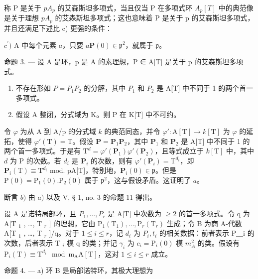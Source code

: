 称 P 是关于 \(pA_{p}\) 的艾森斯坦多项式，当且仅当 P 在多项式环 \(A_{p}[T]\) 中的典范像是关于理想 \(pA_{p}\) 的艾森斯坦多项式；这也意味着 P 是关于 p 的艾森斯坦多项式，并且还满足下述比 c) 更强的条件：

\(c^{\prime})\) A 中每个元素 \(a\)，只要 \(a\mathbf{P}(0)\in\mathfrak{p}^{2}\)，就属于 \(\mathfrak{p}\)。

命题 3. --- 设 A 是环，p 是 A 的素理想，P ∈ A{[}T{]} 是关于 p 的艾森斯坦多项式。

\begin{enumerate}
\def\labelenumi{\alph{enumi})}
\item
  不存在形如 \(P = P_{1}P_{2}\) 的分解，其中 \(P_{1}\) 和 \(P_{2}\) 是 A{[}T{]} 中不同于 1 的两个首一多项式。
\item
  假设 A 整闭，分式域为 K。则 P 在 K[T] 中不可约。
\end{enumerate}

令 \(\varphi\) 为从 A 到 A/p 的分式域 \(k\) 的典范同态，并令 \(\varphi':\mathrm{A}[\mathrm{T}]\to k[\mathrm{T}]\) 为 \(\varphi\) 的延拓，使得 \(\varphi'(\mathrm{T})=\mathrm{T}\)。假设 \(\mathbf{P}=\mathbf{P}_{1}\mathbf{P}_{2}\)，其中 \(\mathbf{P}_{1}\) 和 \(\mathbf{P}_{2}\) 是 A{[}T{]} 中不同于 1 的两个首一多项式。于是有 \(\mathrm{T}^{d}=\varphi'(\mathbf{P}_{1})\varphi'(\mathbf{P}_{2})\)，且等式成立于 \(k[\mathrm{T}]\) 中，其中 \(d\) 为 P 的次数。若 \(d_{i}\) 是 \(\mathbf{P}_{i}\) 的次数，则有 \(\varphi'(\mathbf{P}_{i})=\mathrm{T}^{d_{i}}\)，即 \(\mathbf{P}_{i}(\mathrm{T})\equiv\mathrm{T}^{d_{i}}\text{ mod. pA[T]}\)，特别地，\(\mathbf{P}_{i}(0)\in\mathfrak{p}\)。但是 \(\mathrm{P}(0)=\mathrm{P}_{1}(0).\mathrm{P}_{2}(0)\) 属于 \(\mathfrak{p}^{2}\)，这与假设矛盾。这证明了 \(a\)。

断言 \(b)\) 由 \(a)\) 以及 V, § 1, no. 3 的命题 11 得出。

设 A 是诺特局部环，且 \(P_{1}, \ldots, P_{r}\) 是 A{[}T{]} 中次数为 \(\geqslant 2\) 的首一多项式。令 q 为 A{[}T \(_{1}\) , \ldots, T \(_{r}\) {]} 的理想，它由 \(\mathrm{P}_{1}(\mathrm{T}_{1}), \ldots, \mathrm{P}_{r}(\mathrm{T}_{r})\) 生成；令 B 为商 A-代数 A{[}T \(_{1}\) , \ldots, T \(_{r}\) {]}/q。对于 \(1 \leqslant i \leqslant r\)，记 \(d_{i}\) 为 \(P_{i}, t_{i}\) 的相关数据：前者表示 P＿i 的次数，后者表示 T \(_{i}\) 模 q 的类；并记 \(\gamma_{i}\) 为 \(c_{i} = \mathrm{P}_{i}(0)\) 模 \(m_{A}^{2}\) 的类。假设有 \(\mathrm{P}_{i}(\mathrm{T}) \equiv \mathrm{T}^{d_{i}} \mod \mathrm{m}_{\mathrm{A}}\mathrm{A}[\mathrm{T}]\)，这对 \(1 \leqslant i \leqslant r\) 成立。

命题 4. --- a) 环 B 是局部诺特环，其极大理想为

